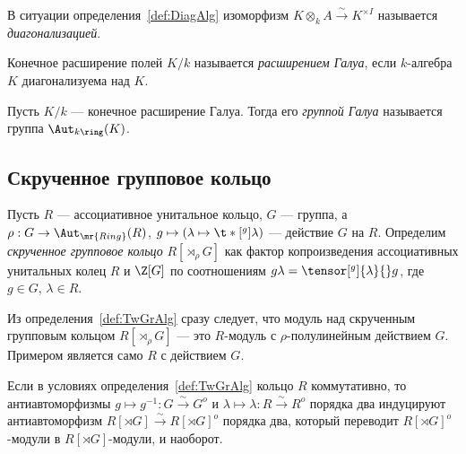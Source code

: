 \documentclass[
	extrafontsizes,
	11pt,
	hyphens,
]{memoir}
\begin{document}
\begin{remark}
В ситуации определения~\ref{def:DiagAlg} изоморфизм \(K \otimes_k A \xrightarrow{\sim} K^{\times I}\) называется \emph{диагонализацией}.
\end{remark}

\begin{definition}
Конечное расширение полей \(K / k\) называется \emph{расширением Галуа}, если \(k\)-алгебра \(K\) диагонализуема над \(K\).
\end{definition}

\begin{definition}
Пусть \(K/k\) --- конечное расширение Галуа.
Тогда его \emph{группой Галуа} называется группа
\(\Aut_{k\ring}(K)\).
\end{definition}

\subsection{Скрученное групповое кольцо}

\begin{definition} \label{def:TwGrAlg}
Пусть \(R\) --- ассоциативное унитальное кольцо, \(G\) --- группа, а \(\rho : G \to \Aut_{\mr{Ring}}(R)\), \(g \mapsto (\lambda \mapsto \t*[^g]{\lambda}{})\) --- действие \(G\) на \(R\).
Определим \emph{скрученное групповое кольцо} \(R[\rtimes_\rho G]\) как фактор копроизведения ассоциативных унитальных колец \(R\) и \(\Z[G]\) по соотношениям \(g \lambda = \tensor[^g]{\lambda}{} g\), где \(g \in G\), \(\lambda \in R\).
\end{definition}

\begin{remark}
Из определения~\ref{def:TwGrAlg} сразу следует, что модуль над скрученным групповым кольцом \(R[\rtimes_\rho G]\) --- это \(R\)-модуль с \(\rho\)-по\-лу\-ли\-ней\-ным действием \(G\).
Примером является само \(R\) с действием \(G\).
\end{remark}

\begin{observation} \label{obs:TwGrAlgInvol}
Если в условиях определения~\ref{def:TwGrAlg} кольцо \(R\) коммутативно,
то антиавтоморфизмы \(g \mapsto g^{-1} : G \xrightarrow{\sim} G^o\) и \(\lambda \mapsto \lambda : R \xrightarrow{\sim} R^o\) порядка два индуцируют антиавтоморфизм \(R[\rtimes G] \xrightarrow{\sim} R[\rtimes G]^o\) порядка два,
который переводит \(R[\rtimes G]^o\)-мо\-ду\-ли в \(R[\rtimes G]\)-мо\-ду\-ли, и наоборот.
\end{observation}
\end{document}
